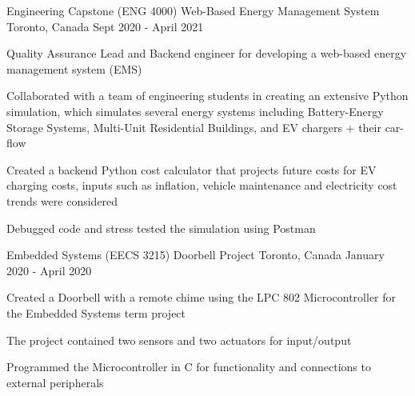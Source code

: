 


\begin{cventries}


\cventry
{Engineering Capstone (ENG 4000)} %
{Web-Based Energy Management System} %
{Toronto, Canada} %
{Sept 2020 - April 2021} %
{ %
\begin{cvitems}
\item {Quality Assurance Lead and Backend engineer for developing a web-based energy management system (EMS)}
\item {Collaborated with a team of engineering students in creating an extensive Python simulation, which simulates several energy systems including Battery-Energy Storage Systems, Multi-Unit Residential Buildings, and EV chargers + their car-flow}
\item {Created a backend Python cost calculator that projects future costs for EV charging costs, inputs such as inflation, vehicle maintenance and electricity cost trends were considered}
\item {Debugged code and stress tested the simulation using Postman}
\end{cvitems}
}

\cventry
{Embedded Systems (EECS 3215) }
{Doorbell Project }
{Toronto, Canada}
{January 2020 - April 2020}
{ %
\begin{cvitems}
\item {Created a Doorbell with a remote chime using the LPC 802 Microcontroller for the Embedded Systems term project}
\item {The project contained two sensors and two actuators for input/output}
\item {Programmed the Microcontroller in C for functionality and connections to external peripherals}
\end{cvitems}
}


\end{cventries}